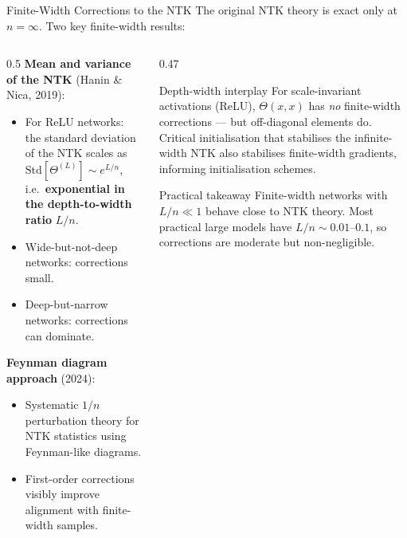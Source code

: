 \documentclass[aspectratio=169, 10pt]{beamer}
\newcommand{\myalert}[1]{\textcolor{red!70!black}{\textbf{#1}}}
\begin{document}
\begin{frame}{Finite-Width Corrections to the NTK}
  The original NTK theory is exact only at $n=\infty$. Two key finite-width results:

  \vspace{0.3em}
  \begin{columns}[T]
    \begin{column}{0.5\textwidth}
      \textbf{Mean and variance of the NTK} (Hanin \& Nica, 2019):
      \begin{itemize}
        \item For ReLU networks: the standard deviation of the NTK scales as
          $\mathrm{Std}[\Theta^{(L)}] \sim e^{L/n}$,
          i.e.\ \myalert{exponential in the depth-to-width ratio} $L/n$.
        \item Wide-but-not-deep networks: corrections small.
        \item Deep-but-narrow networks: corrections can dominate.
      \end{itemize}
      \vspace{0.3em}
      \textbf{Feynman diagram approach} (2024):
      \begin{itemize}
        \item Systematic $1/n$ perturbation theory for NTK statistics using Feynman-like diagrams.
        \item First-order corrections visibly improve alignment with finite-width samples.
      \end{itemize}
    \end{column}
    \begin{column}{0.47\textwidth}
      \begin{alertblock}{Depth-width interplay}
        For scale-invariant activations (ReLU), $\Theta(x,x)$ has \emph{no} finite-width corrections — but off-diagonal elements do. Critical initialisation that stabilises the infinite-width NTK also stabilises finite-width gradients, informing initialisation schemes.
      \end{alertblock}
      \vspace{0.4em}
      \begin{exampleblock}{Practical takeaway}
        Finite-width networks with $L/n \ll 1$ behave close to NTK theory. Most practical large models have $L/n \sim 0.01$–$0.1$, so corrections are moderate but non-negligible.
      \end{exampleblock}
    \end{column}
  \end{columns}
\end{frame}
\end{document}

